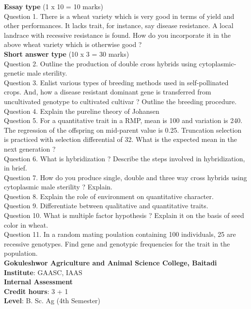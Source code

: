 \documentclass[12pt]{article}\usepackage[]{graphicx}\usepackage[]{color}
\begin{document}
\textbf{Essay type} (1 x 10 = 10 marks) \\
Question 1. There is a wheat variety which is very good in terms of yield and other performances. It lacks trait, for instance, say disease resistance. A local landrace with recessive resistance is found. How do you incorporate it in the above wheat variety which is otherwise good ?\\
\textbf{Short answer type} (10 x 3 = 30 marks) \\
Question 2. Outline the production of double cross hybrids using cytoplasmic-genetic male sterility.\\
Question 3. Enlist various types of breeding methods used in self-pollinated crops. And, how a disease resistant dominant gene is transferred from uncultivated genotype to cultivated cultivar ? Outline the breeding procedure.\\
Question 4. Explain the pureline theory of Johansen\\
Question 5. For a quantitative trait in a RMP, mean is 100 and variation is 240. The regression of the offspring on mid-parent value is 0.25. Truncation selection is practiced with selection differential of 32. What is the expected mean in the next generation ?\\
Question 6. What is hybridization ? Describe the steps involved in hybridization, in brief.\\
Question 7. How do you produce single, double and three way cross hybrids using cytoplasmic male sterility ? Explain.\\
Question 8. Explain the role of environment on quantitative character.\\
Question 9. Differentiate between qualitative and quantitative traits.\\
Question 10. What is multiple factor hypothesis ? Explain it on the basis of seed color in wheat.\\
Question 11. In a random mating poulation containing 100 individuals, 25 are recessive genotypes. Find gene and genotypic frequencies for the trait in the population.\\
\clearpage 
{\centering \Large{\textbf{Gokuleshwor Agriculture and Animal Science College, Baitadi}} \\[0.25cm]
            \textbf{Institute}: GAASC, IAAS \\[0.2cm]
            \textbf{Internal Assessment} \\[0.2cm]} 
\textbf{Credit hours}: 3 + 1 \\ 
\textbf{Level}: B. Sc. Ag (4th Semester) \\
\end{document}
